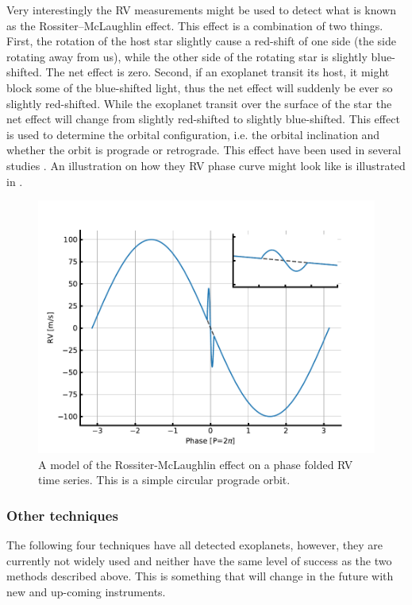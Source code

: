 Very interestingly the RV measurements might be used to detect what is known as the
Rossiter–McLaughlin effect. This effect is a combination of two things. First, the rotation of the
host star slightly cause a red-shift of one side (the side rotating away from us), while the other
side of the rotating star is slightly blue-shifted. The net effect is zero. Second, if an exoplanet
transit its host, it might block some of the blue-shifted light, thus the net effect will suddenly
be ever so slightly red-shifted. While the exoplanet transit over the surface of the star the net
effect will change from slightly red-shifted to slightly blue-shifted. This effect is used to
determine the orbital configuration, i.e. the orbital inclination and whether the orbit is prograde
or retrograde. This effect have been used in several studies \citep[][to mention just a
few]{Winn2005,Triaud2010}. An illustration on how they RV phase curve might look like is illustrated
in .

\begin{figure}[htpb!]
    \centering
    \includegraphics[width=1.0\linewidth]{figures/RMeffect.pdf}
    \caption{A model of the Rossiter-McLaughlin effect on a phase folded RV time series. This is a
             simple circular prograde orbit.}
    \label{fig:RMeffect}
\end{figure}

\subsubsection{Other techniques}

The following four techniques have all detected exoplanets, however, they are currently not widely
used and neither have the same level of success as the two methods described above. This is
something that will change in the future with new and up-coming instruments.

